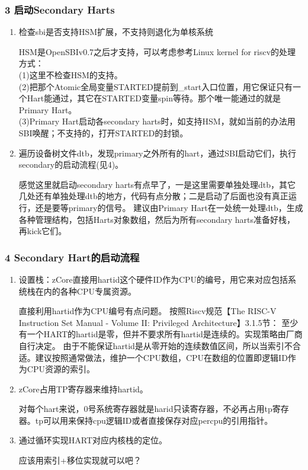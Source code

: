 \documentclass[
8pt, %
]{beamer}
\begin{document}
	\begin{frame}
		\frametitle{3 启动Secondary Harts}
		\begin{enumerate}
			\item 检查sbi是否支持HSM扩展，不支持则退化为单核系统
			\begin{block}{}
				HSM是OpenSBIv0.7之后才支持，可以考虑参考Linux kernel for riscv的处理方式：\\
				(1)这里不检查HSM的支持。\\
				(2)把那个Atomic全局变量STARTED提前到\_start入口位置，用它保证只有一个Hart能通过，其它在STARTED变量spin等待。那个唯一能通过的就是Primary Hart。\\
				(3)Primary Hart启动各secondary harts时，如支持HSM，就如当前的办法用SBI唤醒；不支持的，打开STARTED的封锁。
			\end{block}
			\item 遍历设备树文件dtb，发现primary之外所有的hart，通过SBI启动它们，执行secondary的启动流程(见4)。
			\begin{block}{}
				感觉这里就启动secondary harts有点早了，一是这里需要单独处理dtb，其它几处还有单独处理dtb的地方，代码有点分散；二是启动了后面也没有真正运行，还是要等primary的信号。
				建议由Primary Hart在一处统一处理dtb，生成各种管理结构，包括Harts对象数组，然后为所有secondary harts准备好栈，再kick它们。
			\end{block}
		\end{enumerate}
	\end{frame}

	\begin{frame}
		\frametitle{4 Secondary Hart的启动流程}
		\begin{enumerate}
			\item 设置栈：zCore直接用hartid这个硬件ID作为CPU的编号，用它来对应包括系统栈在内的各种CPU专属资源。
			\begin{block}{}
				直接利用hartid作为CPU编号有点问题。
				按照Riscv规范【The RISC-V Instruction Set Manual - Volume II: Privileged Architecture】3.1.5节：
				至少有一个HART的hartid是零，但并不要求所有hartid是连续的。实现策略由厂商自行决定。
				由于不能保证hartid是从零开始的连续数值区间，所以当索引不合适。建议按照通常做法，维护一个CPU数组，CPU在数组的位置即逻辑ID作为CPU资源的索引。
			\end{block}
			\item zCore占用TP寄存器来维持hartid。
			\begin{block}{}
				对每个hart来说，0号系统寄存器就是harid只读寄存器，不必再占用tp寄存器。tp可以用来保持cpu逻辑ID或者直接保存对应percpu的引用指针。
			\end{block}
			\item 通过循环实现HART对应内核栈的定位。
			\begin{block}{}
				应该用索引+移位实现就可以吧？
			\end{block}
		\end{enumerate}
	\end{frame}
\end{document}
